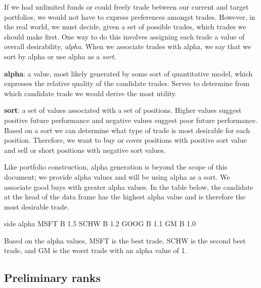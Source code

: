 \documentclass{article}
\begin{document}
If we had unlimited funds or could freely trade between our current
and target portfolios, we would not have to express preferences
amongst trades.  However, in the real world, we must decide, given a
set of possible trades, which trades we should make first.  One way to
do this involves assigning each trade a value of overall desirability,
\emph{alpha}.  When we associate trades with alpha, we say that we
sort by alpha or use alpha as a \emph{sort.}  

\begin{description}

\item{\bf{alpha}}: a value, most likely generated by some sort of
  quantitative model, which expresses the relative quality of the
  candidate trades.  Serves to determine from which candidate trade we
  would derive the most utility.

\item{\bf{sort}}: a set of values associated with a set of positions.
Higher values suggest positive future performance and negative values
suggest poor future performance.  Based on a sort we can determine
what type of trade is most desirable for each position.  Therefore, we
want to buy or cover positions with positive sort value and sell or
short positions with negative sort values.

\end{description}

Like portfolio construction, alpha generation is beyond the scope of
this document; we provide alpha values and will be using alpha as a
sort.  We associate good buys with greater alpha values.  In the table
below, the candidate at the head of the data frame has the highest
alpha value and is therefore the most desirable trade.

\begin{Schunk}
\begin{Soutput}
     side alpha
MSFT    B   1.5
SCHW    B   1.2
GOOG    B   1.1
GM      B   1.0
\end{Soutput}
\end{Schunk}

Based on the alpha values, MSFT is the best trade, SCHW is the second
best trade, and GM is the worst trade with an alpha value of
1.

\subsection{Preliminary ranks}
\end{document}
